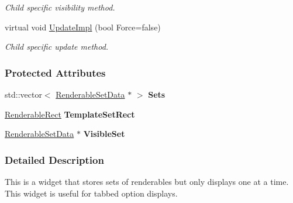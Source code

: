 \begin{DoxyCompactItemize}
\begin{DoxyCompactList}\small\item\em Child specific visibility method. \item\end{DoxyCompactList}\item 
\hypertarget{classMezzanine_1_1UI_1_1TabSet_a2499619c7e53f0de004bfd064e4bec3a}{
virtual void \hyperlink{classMezzanine_1_1UI_1_1TabSet_a2499619c7e53f0de004bfd064e4bec3a}{UpdateImpl} (bool Force=false)}
\label{classMezzanine_1_1UI_1_1TabSet_a2499619c7e53f0de004bfd064e4bec3a}

\begin{DoxyCompactList}\small\item\em Child specific update method. \item\end{DoxyCompactList}\end{DoxyCompactItemize}
\subsubsection*{Protected Attributes}
\begin{DoxyCompactItemize}
\item 
\hypertarget{classMezzanine_1_1UI_1_1TabSet_adbdc5d1f6fbcc74bd5368aefadcb1936}{
std::vector$<$ \hyperlink{structMezzanine_1_1UI_1_1RenderableSetData}{RenderableSetData} $\ast$ $>$ {\bfseries Sets}}
\label{classMezzanine_1_1UI_1_1TabSet_adbdc5d1f6fbcc74bd5368aefadcb1936}

\item 
\hypertarget{classMezzanine_1_1UI_1_1TabSet_a77944b01be57054ee0f218a63e3dc891}{
\hyperlink{structMezzanine_1_1UI_1_1RenderableRect}{RenderableRect} {\bfseries TemplateSetRect}}
\label{classMezzanine_1_1UI_1_1TabSet_a77944b01be57054ee0f218a63e3dc891}

\item 
\hypertarget{classMezzanine_1_1UI_1_1TabSet_a9003ef7f1fca13003f8c98f26c61f7f3}{
\hyperlink{structMezzanine_1_1UI_1_1RenderableSetData}{RenderableSetData} $\ast$ {\bfseries VisibleSet}}
\label{classMezzanine_1_1UI_1_1TabSet_a9003ef7f1fca13003f8c98f26c61f7f3}

\end{DoxyCompactItemize}


\subsubsection{Detailed Description}
This is a widget that stores sets of renderables but only displays one at a time. This widget is useful for tabbed option displays. 

